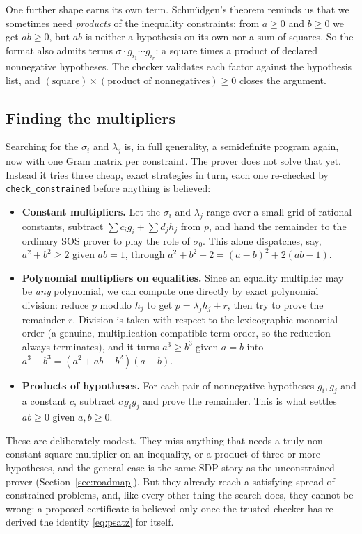 \documentclass[11pt]{article}
\theoremstyle{definition}
\theoremstyle{plain}
\begin{document}
One further shape earns its own term. Schmüdgen's theorem reminds us that we
sometimes need \emph{products} of the inequality constraints: from $a \ge 0$ and
$b \ge 0$ we get $ab \ge 0$, but $ab$ is neither a hypothesis on its own nor a
sum of squares. So the format also admits terms
$\sigma \cdot g_{i_1} \cdots g_{i_r}$: a square times a product of declared
nonnegative hypotheses. The checker validates each factor against the hypothesis
list, and $(\text{square}) \times (\text{product of nonnegatives}) \ge 0$ closes
the argument.

\subsection{Finding the multipliers}

Searching for the $\sigma_i$ and $\lambda_j$ is, in full generality, a
semidefinite program again, now with one Gram matrix per constraint. The prover does
not solve that yet. Instead it tries three cheap, exact strategies in turn, each
one re-checked by \texttt{check\_constrained} before anything is believed:

\begin{itemize}[leftmargin=1.4em]
  \item \textbf{Constant multipliers.} Let the $\sigma_i$ and $\lambda_j$ range
    over a small grid of rational constants, subtract
    $\sum c_i g_i + \sum d_j h_j$ from $p$, and hand the remainder to the
    ordinary SOS prover to play the role of $\sigma_0$. This alone dispatches,
    say, $a^2 + b^2 \ge 2$ given $ab = 1$, through
    $a^2 + b^2 - 2 = (a-b)^2 + 2(ab - 1)$.
  \item \textbf{Polynomial multipliers on equalities.} Since an equality
    multiplier may be \emph{any} polynomial, we can compute one directly by exact
    polynomial division: reduce $p$ modulo $h_j$ to get $p = \lambda_j h_j + r$,
    then try to prove the remainder $r$. Division is taken with respect to the
    lexicographic monomial order (a genuine, multiplication-compatible term
    order, so the reduction always terminates), and it turns $a^3 \ge b^3$ given
    $a = b$ into $a^3 - b^3 = (a^2 + ab + b^2)(a - b)$.
  \item \textbf{Products of hypotheses.} For each pair of nonnegative hypotheses
    $g_i, g_j$ and a constant $c$, subtract $c\,g_i g_j$ and prove the remainder.
    This is what settles $ab \ge 0$ given $a, b \ge 0$.
\end{itemize}

These are deliberately modest. They miss anything that needs a truly non-constant
square multiplier on an inequality, or a product of three or more hypotheses, and
the general case is the same SDP story as the unconstrained prover
(Section~\ref{sec:roadmap}). But they already reach a satisfying spread of
constrained problems, and, like every other thing the search does, they cannot
be wrong: a proposed certificate is believed only once the trusted checker has
re-derived the identity \eqref{eq:psatz} for itself.
\end{document}
